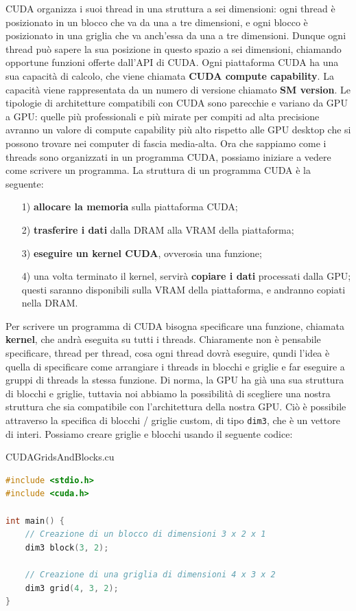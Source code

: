 CUDA organizza i suoi thread in una struttura a sei dimensioni: ogni thread è posizionato in un blocco che va da una a tre dimensioni, e ogni blocco è posizionato in una griglia che va anch'essa da una a tre dimensioni. Dunque ogni thread può sapere la sua posizione in questo spazio a sei dimensioni, chiamando opportune funzioni offerte dall'API di CUDA.
\nl
Ogni piattaforma CUDA ha una sua capacità di calcolo, che viene chiamata \textbf{CUDA compute capability}. La capacità viene rappresentata da un numero di versione chiamato \textbf{SM version}. Le tipologie di architetture compatibili con CUDA sono parecchie e variano da GPU a GPU: quelle più professionali e più mirate per compiti ad alta precisione avranno un valore di compute capability più alto rispetto alle GPU desktop che si possono trovare nei computer di fascia media-alta. 
\nl
Ora che sappiamo come i threads sono organizzati in un programma CUDA, possiamo iniziare a vedere come scrivere un programma. La struttura di un programma CUDA è la seguente:
\begin{itemize}
    \item [1)] \textbf{allocare la memoria} sulla piattaforma CUDA;
    \item [2)] \textbf{trasferire i dati} dalla DRAM alla VRAM della piattaforma;
    \item [3)] \textbf{eseguire un kernel CUDA}, ovverosia una funzione;
    \item [4)] una volta terminato il kernel, servirà \textbf{copiare i dati} processati dalla GPU; questi saranno disponibili sulla VRAM della piattaforma, e andranno copiati nella DRAM.
\end{itemize}

Per scrivere un programma di CUDA bisogna specificare una funzione, chiamata \textbf{kernel}, che andrà eseguita su tutti i threads. Chiaramente non è pensabile specificare, thread per thread, cosa ogni thread dovrà eseguire, qundi l'idea è quella di specificare come arrangiare i threads in blocchi e griglie e far eseguire a gruppi di threads la stessa funzione.
\nl
Di norma, la GPU ha già una sua struttura di blocchi e griglie, tuttavia noi abbiamo la possibilità di scegliere una nostra struttura che sia compatibile con l'architettura della nostra GPU. Ciò è possibile attraverso la specifica di blocchi / griglie custom, di tipo \verb|dim3|, che è un vettore di interi. Possiamo creare griglie e blocchi usando il seguente codice:

\begin{codeblock}{CUDAGridsAndBlocks.cu}
    \begin{lstlisting}[language = C]
#include <stdio.h>
#include <cuda.h>

int main() {
    // Creazione di un blocco di dimensioni 3 x 2 x 1
    dim3 block(3, 2);

    // Creazione di una griglia di dimensioni 4 x 3 x 2
    dim3 grid(4, 3, 2);
}\end{lstlisting}
\end{codeblock}

